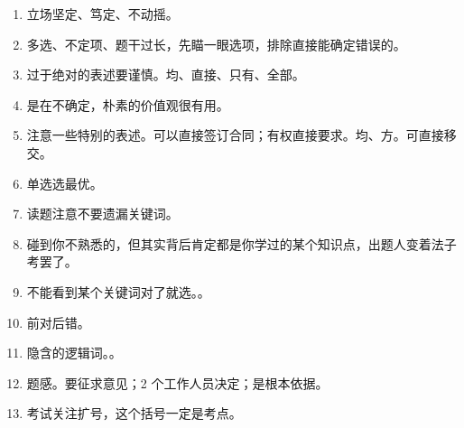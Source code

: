 \begin{enumerate}
  \item 立场坚定、笃定、不动摇。
  \item 多选、不定项、题干过长，先瞄一眼选项，排除直接能确定错误的。
  \item 过于绝对的表述要谨慎。均、直接、只有、全部。
  \item 是在不确定，朴素的价值观很有用。
  \item 注意一些特别的表述。可以直接签订合同；有权直接要求。均、方。可直接移交。
  \item 单选选最优。
  \item 读题注意不要遗漏关键词。
  \item 碰到你不熟悉的，但其实背后肯定都是你学过的某个知识点，出题人变着法子考罢了。
  \item 不能看到某个关键词对了就选。。
  \item 前对后错。
  \item 隐含的逻辑词。。
  \item 题感。要征求意见；2 个工作人员决定；是根本依据。
  \item 考试关注扩号，这个括号一定是考点。
\end{enumerate}
